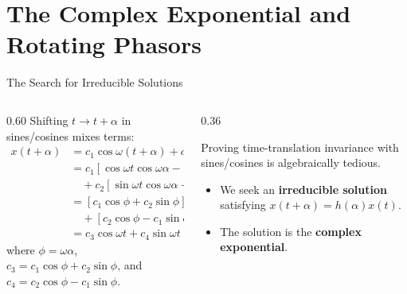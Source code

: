 \documentclass[aspectratio=169,xcolor=dvipsnames]{beamer}
\begin{document}
\section{The Complex Exponential and Rotating Phasors}

\begin{frame}{The Search for Irreducible Solutions}
  \begin{columns}[T]
    \begin{column}{0.60\textwidth}
      Shifting $t \to t+\alpha$ in sines/cosines mixes terms:
      \begin{align*}
        x(t+\alpha) &= c_1 \cos\omega(t+\alpha) + c_2 \sin\omega(t+\alpha) \\
        &= c_1 [\cos\omega t\cos\omega\alpha - \sin\omega t\sin\omega\alpha] \\
        &\quad + c_2 [\sin\omega t\cos\omega\alpha + \cos\omega t\sin\omega\alpha] \\
        &= [c_1\cos\phi + c_2\sin\phi]\cos\omega t \\
        &\quad + [c_2\cos\phi - c_1\sin\phi]\sin\omega t \\
        &= c_3 \cos\omega t + c_4 \sin\omega t
      \end{align*}
      where $\phi = \omega\alpha$, $c_3 = c_1\cos\phi + c_2\sin\phi$, and $c_4 = c_2\cos\phi - c_1\sin\phi$.
    \end{column}
    \hfill
    \begin{column}{0.36\textwidth}
      \begin{umnote}
        Proving time-translation invariance with sines/cosines is algebraically tedious.
      \end{umnote}
      \begin{itemize}
        \item We seek an \textbf{irreducible solution} satisfying $x(t+\alpha) = h(\alpha)x(t)$.
        \item The solution is the \textbf{complex exponential}.
      \end{itemize}
    \end{column}
  \end{columns}
\end{frame}
\end{document}
